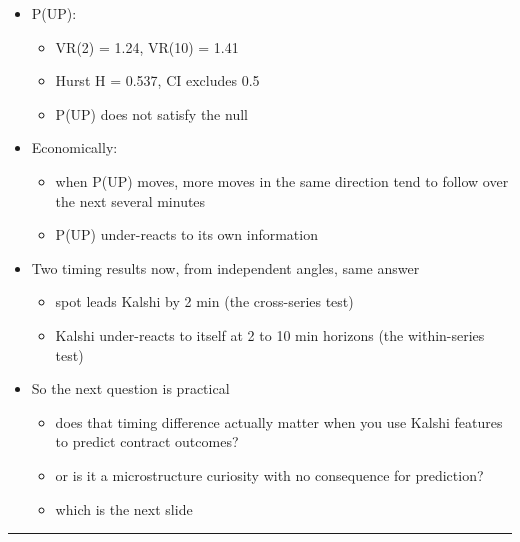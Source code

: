 \documentclass[
]{article}
\providecommand{\tightlist}{%
  \setlength{\itemsep}{0pt}\setlength{\parskip}{0pt}}
\begin{document}
\begin{itemize}
  \begin{itemize}
  \tightlist
  \item
    VR(q) within 1\% of 1.00 at every horizon
  \item
    Hurst H = 0.498, CI contains 0.5
  \item
    spot satisfies the random-walk null at minute frequency
  \end{itemize}
\item
  P(UP):

  \begin{itemize}
  \tightlist
  \item
    VR(2) = 1.24, VR(10) = 1.41
  \item
    Hurst H = 0.537, CI excludes 0.5
  \item
    P(UP) does not satisfy the null
  \end{itemize}
\item
  Economically:

  \begin{itemize}
  \tightlist
  \item
    when P(UP) moves, more moves in the same direction tend to follow
    over the next several minutes
  \item
    P(UP) under-reacts to its own information
  \end{itemize}
\item
  Two timing results now, from independent angles, same answer

  \begin{itemize}
  \tightlist
  \item
    spot leads Kalshi by 2 min (the cross-series test)
  \item
    Kalshi under-reacts to itself at 2 to 10 min horizons (the
    within-series test)
  \end{itemize}
\item
  So the next question is practical

  \begin{itemize}
  \tightlist
  \item
    does that timing difference actually matter when you use Kalshi
    features to predict contract outcomes?
  \item
    or is it a microstructure curiosity with no consequence for
    prediction?
  \item
    which is the next slide
  \end{itemize}
\end{itemize}

\begin{center}\rule{0.5\linewidth}{0.5pt}\end{center}
\end{document}
